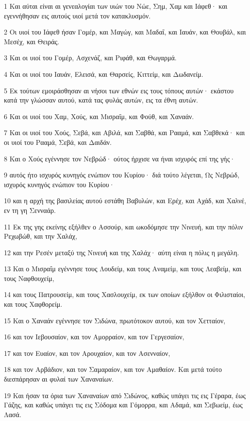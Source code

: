 \par 1 Και αύται είναι αι γενεαλογίαι των υιών του Νώε, Σημ, Χαμ και Ιάφεθ· και εγεννήθησαν εις αυτούς υιοί μετά τον κατακλυσμόν.
\par 2 Οι υιοί του Ιάφεθ ήσαν Γομέρ, και Μαγώγ, και Μαδαΐ, και Ιαυάν, και Θουβάλ, και Μεσέχ, και Θειράς.
\par 3 Και οι υιοί του Γομέρ, Ασχενάζ, και Ριφάθ, και Θωγαρμά.
\par 4 Και οι υιοί του Ιαυάν, Ελεισά, και Θαρσείς, Κιττείμ, και Δωδανείμ.
\par 5 Εκ τούτων εμοιράσθησαν αι νήσοι των εθνών εις τους τόπους αυτών· εκάστου κατά την γλώσσαν αυτού, κατά τας φυλάς αυτών, εις τα έθνη αυτών.
\par 6 Και οι υιοί του Χαμ, Χούς, και Μισραΐμ, και Φούθ, και Χαναάν.
\par 7 Και οι υιοί του Χούς, Σεβά, και Αβιλά, και Σαβθά, και Ρααμά, και Σαβθεκά· και οι υιοί του Ρααμά, Σεβά, και Δαιδάν.
\par 8 Και ο Χούς εγέννησε τον Νεβρώδ· ούτος ήρχισε να ήναι ισχυρός επί της γής·
\par 9 αυτός ήτο ισχυρός κυνηγός ενώπιον του Κυρίου· διά τούτο λέγεται, Ως Νεβρώδ, ισχυρός κυνηγός ενώπιον του Κυρίου·
\par 10 και η αρχή της βασιλείας αυτού εστάθη Βαβυλών, και Ερέχ, και Αχάδ, και Χαλνέ, εν τη γη Σενναάρ.
\par 11 Εκ της γης εκείνης εξήλθεν ο Ασσούρ, και ωκοδόμησε την Νινευή, και την πόλιν Ρεχωβώθ, και την Χαλάχ,
\par 12 και την Ρεσέν μεταξύ της Νινευή και της Χαλάχ· αύτη είναι η πόλις η μεγάλη.
\par 13 Και ο Μισραΐμ εγέννησε τους Λουδείμ, και τους Αναμείμ, και τους Λεαβείμ, και τους Ναφθουχείμ,
\par 14 και τους Πατρουσείμ, και τους Χασλουχείμ, εκ των οποίων εξήλθον οι Φιλισταίοι, και τους Χαφθορείμ.
\par 15 Και ο Χαναάν εγέννησε τον Σιδώνα, πρωτότοκον αυτού, και τον Χετταίον,
\par 16 και τον Ιεβουσαίον, και τον Αμορραίον, και τον Γεργεσαίον,
\par 17 και τον Ευαίον, και τον Αρουχαίον, και τον Ασενναίον,
\par 18 και τον Αρβάδιον, και τον Σαμαραίον, και τον Αμαθαίον. Και μετά τούτο διεσπάρησαν αι φυλαί των Χαναναίων.
\par 19 Και ήσαν τα όρια των Χαναναίων από Σιδώνος, καθώς υπάγει τις εις Γέραρα, έως Γάζης, και καθώς υπάγει τις εις Σόδομα και Γόμορρα, και Αδαμά, και Σεβωείμ, έως Λασά.
